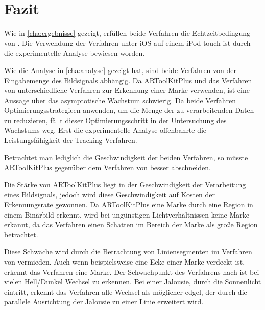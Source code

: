 \chapter{Fazit} %
\label{cha:fazit}

Wie in \autoref{cha:ergebnisse} gezeigt, erfüllen beide Verfahren die Echtzeitbedingung von \citeauthor{azuma97}. Die Verwendung der Verfahren unter iOS auf einem iPod touch ist durch die experimentelle Analyse bewiesen worden.

Wie die Analyse in \autoref{cha:analyse} gezeigt hat, sind beide Verfahren von der Eingabemenge des Bildsignals abhängig. Da ARToolKitPlus und das Verfahren von \citeauthor{hirzer} unterschiedliche Verfahren zur Erkennung einer Marke verwenden, ist eine Aussage über das asymptotische Wachstum schwierig. Da beide Verfahren Optimierungsstrategieen anwenden, um die Menge der zu verarbeitenden Daten zu reduzieren, fällt dieser Optimierungsschritt in der Untersuchung des Wachstums weg. Erst die experimentelle Analyse offenbahrte die Leistungsfähigkeit der Tracking Verfahren.

Betrachtet man lediglich die Geschwindigkeit der beiden Verfahren, so müsste ARToolKitPlus gegenüber dem Verfahren von \citeauthor{hirzer08} besser abschneiden.

Die Stärke von ARToolKitPlus liegt in der Geschwindigkeit der Verarbeitung eines Bildsignals, jedoch wird diese Geschwindigkeit auf Kosten der Erkennungsrate gewonnen. Da ARToolKitPlus eine Marke durch eine Region in einem Binärbild erkennt, wird bei ungünstigen Lichtverhältnissen keine Marke erkannt, da das Verfahren einen Schatten im Bereich der Marke als große Region betrachtet.

Diese Schwäche wird durch die Betrachtung von Liniensegmenten im Verfahren von \citeauthor{hirzer08} vermieden. Auch wenn beispielsweise eine Ecke einer Marke verdeckt ist, erkennt das Verfahren eine Marke. Der Schwachpunkt des Verfahrens nach \citeauthor{hizer08} ist bei vielen Hell/Dunkel Wechsel zu erkennen. Bei einer Jalousie, durch die Sonnenlicht eintritt, erkennt das Verfahren alle Wechsel als möglicher \gls{edgel}, der durch die parallele Ausrichtung der Jalousie zu einer Linie erweitert wird.




